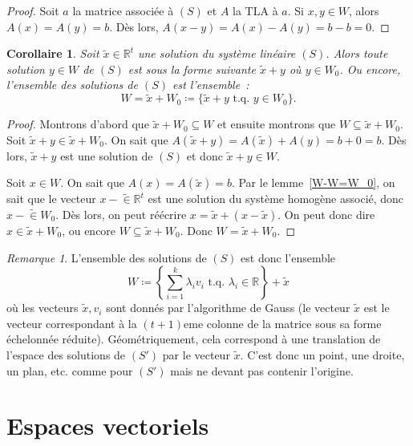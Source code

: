 \documentclass{article}
\newcommand{\R}{\mathbb R}
\newcommand{\tq}{\textrm{ t.q. }}
\newtheorem{cor}[thm]{Corollaire}
\theoremstyle{definition}
\theoremstyle{remark}
\newtheorem*{rmq}{Remarque}
\begin{document}
		\begin{proof} Soit $a$ la matrice associée à $(S)$ et $A$ la TLA à $a$. Si $x, y \in W$, alors $A(x) = A(y) = b$. Dès lors, $A(x-y) = A(x) - A(y) = b-b = 0$.
		\end{proof}

		\begin{cor} Soit $\widetilde x \in \R^t$ une solution du système linéaire $(S)$. Alors toute solution $y \in W$ de $(S)$ est sous la forme suivante
		$\widetilde x + y$ où $y \in W_0$. Ou encore, l'ensemble des solutions de $(S)$ est l'ensemble~:
		\[W = \widetilde x + W_0 \coloneqq \{\widetilde x + y \tq y \in W_0\}.\] \end{cor}

		\begin{proof} Montrons d'abord que $\widetilde x + W_0 \subseteq W$ et ensuite montrons que $W \subseteq \widetilde x + W_0$. Soit
		$\widetilde x + y \in \widetilde x + W_0$. On sait que $A(\widetilde x + y) = A(\widetilde x) + A(y) = b + 0 = b$. Dès lors, $\widetilde x + y$ est une
		solution de $(S)$ et donc $\widetilde x + y \in W$.

		Soit $x \in W$. On sait que $A(x) = A(\widetilde x) = b$. Par le lemme~\ref{W-W=W_0}, on sait que le vecteur $x-\widetilde \in \R^t$ est une solution du système
		homogène associé, donc $x-\widetilde \in W_0$. Dès lors, on peut réécrire $x = \widetilde x + (x-\widetilde x)$. On peut donc dire $x \in \widetilde x + W_0$, ou
		encore $W \subseteq \widetilde x + W_0$. Donc $W = \widetilde x + W_0$. \end{proof}

		\begin{rmq} L'ensemble des solutions de $(S)$ est donc l'ensemble \[W \coloneqq \left\{\sum_{i=1}^k\lambda_iv_i \tq \lambda_i \in \R\right\} + \widetilde x\] où
		les vecteurs $\widetilde x, v_i$ sont donnés par l'algorithme de Gauss (le vecteur $\widetilde x$ est le vecteur correspondant à la $(t+1)$eme colonne de
		la matrice sous sa forme échelonnée réduite). Géométriquement, cela correspond à une translation de l'espace des solutions de $(S')$ par le vecteur
		$\widetilde x$. C'est donc un point, une droite, un plan, etc. comme pour $(S')$ mais ne devant pas contenir l'origine. \end{rmq}

\newpage
\section{Espaces vectoriels}
\end{document}
